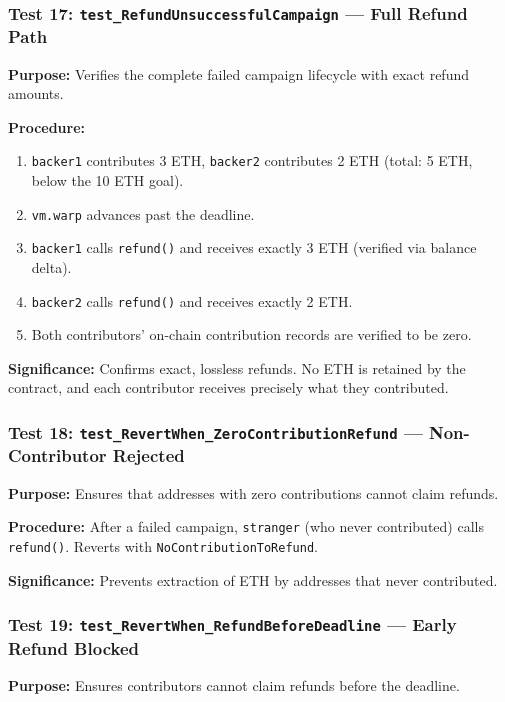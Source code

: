 \subsubsection{Test 17: \texttt{test\_RefundUnsuccessfulCampaign} --- Full Refund Path}

\textbf{Purpose:} Verifies the complete failed campaign lifecycle with exact refund amounts.

\textbf{Procedure:}
\begin{enumerate}[leftmargin=1.5em]
    \item \texttt{backer1} contributes 3 ETH, \texttt{backer2} contributes 2 ETH (total: 5 ETH, below the 10 ETH goal).
    \item \texttt{vm.warp} advances past the deadline.
    \item \texttt{backer1} calls \texttt{refund()} and receives exactly 3 ETH (verified via balance delta).
    \item \texttt{backer2} calls \texttt{refund()} and receives exactly 2 ETH.
    \item Both contributors' on-chain contribution records are verified to be zero.
\end{enumerate}

\textbf{Significance:} Confirms exact, lossless refunds. No ETH is retained by the contract, and each contributor receives precisely what they contributed.

\subsubsection{Test 18: \texttt{test\_RevertWhen\_ZeroContributionRefund} --- Non-Contributor Rejected}

\textbf{Purpose:} Ensures that addresses with zero contributions cannot claim refunds.

\textbf{Procedure:} After a failed campaign, \texttt{stranger} (who never contributed) calls \texttt{refund()}. Reverts with \texttt{NoContributionToRefund}.

\textbf{Significance:} Prevents extraction of ETH by addresses that never contributed.

\subsubsection{Test 19: \texttt{test\_RevertWhen\_RefundBeforeDeadline} --- Early Refund Blocked}

\textbf{Purpose:} Ensures contributors cannot claim refunds before the deadline.

